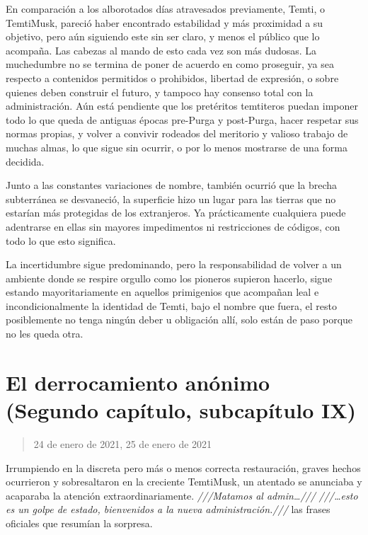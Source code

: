 \documentclass[
  spanish,
]{book}
\begin{document}
En comparación a los alborotados días atravesados previamente, Temti, o TemtiMusk, pareció haber encontrado estabilidad y más proximidad a su objetivo, pero aún siguiendo este sin ser claro, y menos el público que lo acompaña. Las cabezas al mando de esto cada vez son más dudosas. La muchedumbre no se termina de poner de acuerdo en como proseguir, ya sea respecto a contenidos permitidos o prohibidos, libertad de expresión, o sobre quienes deben construir el futuro, y tampoco hay consenso total con la administración. Aún está pendiente que los pretéritos temtiteros puedan imponer todo lo que queda de antiguas épocas pre-Purga y post-Purga, hacer respetar sus normas propias, y volver a convivir rodeados del meritorio y valioso trabajo de muchas almas, lo que sigue sin ocurrir, o por lo menos mostrarse de una forma decidida.

Junto a las constantes variaciones de nombre, también ocurrió que la brecha subterránea se desvaneció, la superficie hizo un lugar para las tierras que no estarían más protegidas de los extranjeros. Ya prácticamente cualquiera puede adentrarse en ellas sin mayores impedimentos ni restricciones de códigos, con todo lo que esto significa.

La incertidumbre sigue predominando, pero la responsabilidad de volver a un ambiente donde se respire orgullo como los pioneros supieron hacerlo, sigue estando mayoritariamente en aquellos primigenios que acompañan leal e incondicionalmente la identidad de Temti, bajo el nombre que fuera, el resto posiblemente no tenga ningún deber u obligación allí, solo están de paso porque no les queda otra.

\hypertarget{el-derrocamiento-anuxf3nimo-segundo-capuxedtulo-subcapuxedtulo-ix}{%
\section{El derrocamiento anónimo (Segundo capítulo, subcapítulo IX)}\label{el-derrocamiento-anuxf3nimo-segundo-capuxedtulo-subcapuxedtulo-ix}}

\begin{quote}
24 de enero de 2021, 25 de enero de 2021
\end{quote}

Irrumpiendo en la discreta pero más o menos correcta restauración, graves hechos ocurrieron y sobresaltaron en la creciente TemtiMusk, un atentado se anunciaba y acaparaba la atención extraordinariamente. \emph{///Matamos al admin\ldots///} \emph{///\ldots esto es un golpe de estado, bienvenidos a la nueva administración.///} las frases oficiales que resumían la sorpresa.
\end{document}
